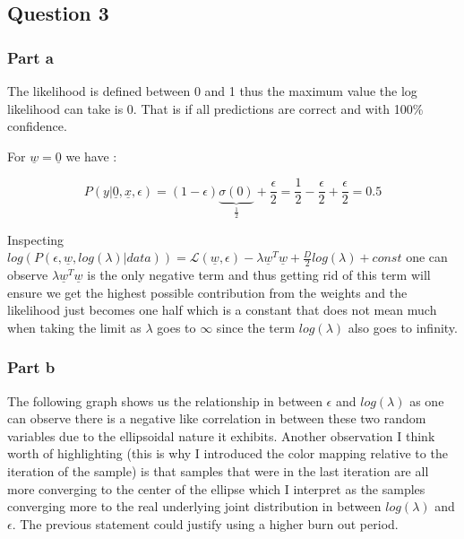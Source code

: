\documentclass[11pt]{article}
\begin{document}
\subsection{Question 3}


\subsubsection{Part a}



The likelihood is defined between 0 and 1 thus the maximum value the log likelihood can take is  0. That is if all predictions are correct and with 100\% confidence. 

For $\underline{w} = \underline{0}$ we have :

\[
P(y| \underline{0}, \underline{x}, \epsilon) = (1- \epsilon)\underbrace{\sigma(0)}_{\frac{1}{2}} + \frac{\epsilon}{2} = \frac{1}{2} - \frac{\epsilon}{2} + \frac{\epsilon}{2} = 0.5
\]


Inspecting $log (P( \epsilon, \underline{w}, log (\lambda) | data) )= \mathcal{L}(\underline{w}, \epsilon) - \lambda \underline{w}^{T} \underline{w} +
\frac{D}{2}log(\lambda) + const$  one can observe  $\lambda \underline{w}^{T} \underline{w}$ is the only negative term and thus getting rid of this term will ensure we get the highest possible contribution from the weights and the likelihood just becomes one half which is a constant that does not mean much when taking the limit as $\lambda$ goes to $\infty$  since the term $log(\lambda)$ also goes to infinity.

\subsubsection{Part b}

The following graph shows us the relationship in between $\epsilon$  and $log(\lambda)$  as one can observe there is a negative like correlation in between these two random variables
due to the ellipsoidal nature it exhibits. Another observation I think worth of highlighting (this is why I introduced the color mapping relative to the iteration of the sample) is that samples that were in the last iteration are all more converging to the center of the ellipse which I interpret as the samples converging more to the real underlying joint distribution in between $log(\lambda)$ and $\epsilon$.  The previous statement could justify using a higher burn out period. 
\end{document}

